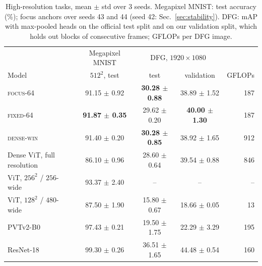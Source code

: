 \documentclass[10pt]{article}
\newcommand{\focus}{\textsc{focus}}
\newcommand{\fixed}{\textsc{fixed}}
\newcommand{\densewin}{\textsc{dense-win}}
\begin{document}
\begin{table}[t]
\centering
\caption{High-resolution tasks, mean $\pm$ std over 3 seeds. Megapixel MNIST: test accuracy
(\%); focus anchors over seeds 43 and 44 (seed 42: Sec.~\ref{sec:stability}). DFG: mAP with
max-pooled heads on the official test split and on our validation split, which holds out blocks
of consecutive frames; GFLOPs per DFG image.}
\label{tab:highres}
\begin{tabular}{lcccr}
\toprule
& Megapixel MNIST & \multicolumn{2}{c}{DFG, $1920\times1080$} & \\
Model & $512^2$, test & test & validation & GFLOPs \\
\midrule
\focus-64 & 91.15 $\pm$ 0.92 & \textbf{30.28 $\pm$ 0.88} & 38.89 $\pm$ 1.52 & 187 \\
\fixed-64 & \textbf{91.87 $\pm$ 0.35} & 29.62 $\pm$ 0.20 & \textbf{40.00 $\pm$ 1.30} & 187 \\
\densewin & 91.40 $\pm$ 0.20 & \textbf{30.28 $\pm$ 0.85} & 38.92 $\pm$ 1.65 & 912 \\
Dense ViT, full resolution & 86.10 $\pm$ 0.96 & 28.60 $\pm$ 0.64 & 39.54 $\pm$ 0.88 & 846 \\
ViT, $256^2$ / $256$-wide & 93.37 $\pm$ 2.40 & -- & -- & -- \\
ViT, $128^2$ / $480$-wide & 87.50 $\pm$ 1.90 & 15.80 $\pm$ 0.67 & 18.66 $\pm$ 0.05 & 13 \\
\midrule
PVTv2-B0 & 97.43 $\pm$ 0.21 & 19.50 $\pm$ 1.75 & 22.29 $\pm$ 3.29 & 195 \\
ResNet-18 & 99.30 $\pm$ 0.26 & 36.51 $\pm$ 1.65 & 44.48 $\pm$ 0.54 & 160 \\
\bottomrule
\end{tabular}
\end{table}
\end{document}
